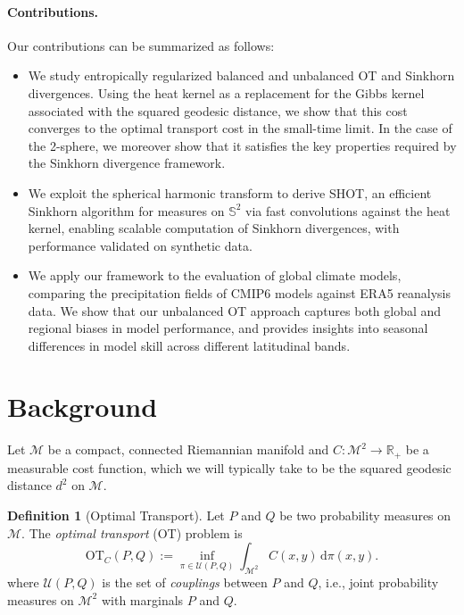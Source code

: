 \documentclass{article}
\theoremstyle{plain}
\theoremstyle{definition}
\newtheorem{definition}[theorem]{Definition}
\theoremstyle{remark}
\renewcommand{\S}{\ensuremath{\mathbb{S}}}
\newcommand{\M}{\ensuremath{\mathcal{M}}}
\newcommand{\U}{\ensuremath{\mathcal{U}}}
\begin{document}
\paragraph{Contributions.}
Our contributions can be summarized as follows:
\begin{itemize}
    \item We study entropically regularized balanced and unbalanced OT and Sinkhorn divergences. Using the heat kernel as a replacement for the Gibbs kernel associated with the squared geodesic distance, we show that this cost converges to the optimal transport cost in the small-time limit.  In the case of the 2-sphere, we moreover show that it satisfies the key properties required by the Sinkhorn divergence framework.
\item We exploit the spherical harmonic transform to derive \textsc{SHOT}, an efficient Sinkhorn algorithm for measures on $\S^2$ via fast convolutions against the heat kernel, enabling scalable computation of Sinkhorn divergences, with performance validated on synthetic data.
\item We apply our framework to the evaluation of global climate models, comparing the precipitation fields of CMIP6 models against ERA5 reanalysis data. We show that our unbalanced OT approach captures both global and regional biases in model performance, and provides insights into seasonal differences in model skill across different latitudinal bands.
\end{itemize}



\section{Background}\label{sec:background}
Let $\M$ be a compact, connected Riemannian manifold and $C:\M^2 \to \mathbb{R}_+$ be a measurable cost function, which we will typically take to be the squared geodesic distance $d^2$ on $\M$.
\begin{definition}[Optimal Transport] Let $P$ and $Q$ be two probability measures on $\M$.
	The \emph{optimal transport} (OT) problem is
	\begin{equation}\label{eq:ot}
	\mathrm{OT}_C(P,Q) := \inf_{\pi \in \U(P,Q)} \int_{\M^2} C(x,y)\, \mathrm{d}\pi(x,y).
	\end{equation}
  where $\U(P,Q)$ is the set of \emph{couplings} between $P$ and $Q$, i.e., joint probability measures on $\M^2$ with marginals $P$ and $Q$.
\end{definition}
\end{document}

